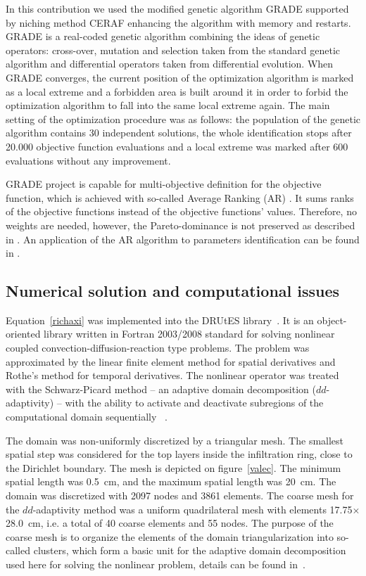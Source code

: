 \documentclass[review,times,3p,twocolumn,10pt]{elsarticle}
\begin{document}
In this contribution we used the modified genetic algorithm GRADE \citep{grade,Kucerova:2007:PHD} supported by niching method CERAF \citep{Hrstka} enhancing the algorithm with
memory and restarts. GRADE is a real-coded genetic algorithm combining the ideas of genetic operators: cross-over, mutation and selection taken from the standard genetic algorithm and differential operators taken from differential evolution. When GRADE converges, the current position of the optimization algorithm is marked as a local extreme and a forbidden area is built around it in order to forbid the optimization algorithm to fall into the same local extreme again. The main setting of the optimization procedure was as follows: the population of the genetic algorithm contains 30 independent solutions, the whole identification stops after 20.000 objective function evaluations and a local extreme was marked after 600 evaluations without any improvement.

GRADE project is capable for multi-objective definition for the objective function, which is achieved with so-called
 Average Ranking (AR) \citep{Leps2007}. It sums ranks of the objective functions instead of the objective functions' values. Therefore, no weights are needed, however, the Pareto-dominance is not preserved as described in \cite{vitingerova:2010}. An application of the AR algorithm to parameters identification can be found in \cite{Kuraz:2010:JCAM}. 


\subsection{Numerical solution and computational issues}
\label{trapoty}

Equation~\eqref{richaxi} was implemented into the DRUtES library~\citep{drutes}. It is an object-oriented library written in Fortran 2003/2008 standard for solving nonlinear coupled convection-diffusion-reaction type problems. The problem was approximated by the linear finite element method for spatial derivatives and Rothe's method for temporal derivatives. The nonlinear operator was treated with the Schwarz-Picard method -- an adaptive domain decomposition  ($dd$-adaptivity) -- with the ability to activate and deactivate subregions of the computational domain sequentially ~\citep{mojecomp, mojejcam2, mojeamc2}.



 The domain was non-uniformly discretized by a triangular mesh. The smallest spatial step was considered for the top layers inside the infiltration ring, close to the Dirichlet boundary. The mesh is depicted on figure~\ref{valec}. The minimum spatial length was 0.5~cm, and the maximum spatial length was 20~cm. The domain was discretized with 2097 nodes and 3861 elements. The coarse mesh for the $dd$-adaptivity method was a uniform quadrilateral mesh with elements 17.75$\times$28.0~cm, i.e. a total of 40 coarse elements and 55 nodes. The purpose of the coarse mesh is to organize the elements of the domain triangularization into so-called clusters, which form a basic unit for the adaptive domain decomposition used here for solving the nonlinear problem, details can be found in~\citep{mojeamc2}.
\end{document}

